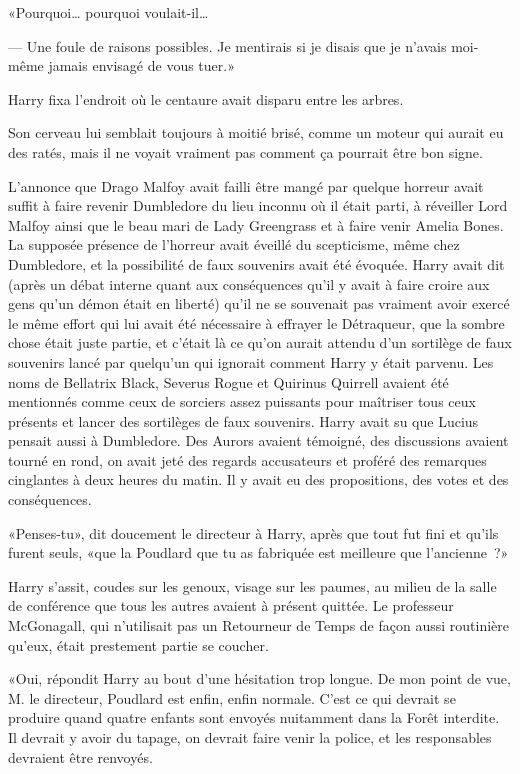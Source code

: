 «Pourquoi… pourquoi voulait-il…

--- Une foule de raisons possibles. Je mentirais si je disais que je n'avais moi-même jamais envisagé de vous tuer.»

Harry fixa l'endroit où le centaure avait disparu entre les arbres.

Son cerveau lui semblait toujours à moitié brisé, comme un moteur qui aurait eu des ratés, mais il ne voyait vraiment pas comment ça pourrait être bon signe.

\later

L'annonce que Drago Malfoy avait failli être mangé par quelque horreur avait suffit à faire revenir Dumbledore du lieu inconnu où il était parti, à réveiller Lord Malfoy ainsi que le beau mari de Lady Greengrass et à faire venir Amelia Bones. La supposée présence de l'horreur avait éveillé du scepticisme, même chez Dumbledore, et la possibilité de faux souvenirs avait été évoquée. Harry avait dit (après un débat interne quant aux conséquences qu'il y avait à faire croire aux gens qu'un démon était en liberté) qu'il ne se souvenait pas vraiment avoir exercé le même effort qui lui avait été nécessaire à effrayer le Détraqueur, que la sombre chose était juste partie, et c'était là ce qu'on aurait attendu d'un sortilège de faux souvenirs lancé par quelqu'un qui ignorait comment Harry y était parvenu. Les noms de Bellatrix Black, Severus Rogue et Quirinus Quirrell avaient été mentionnés comme ceux de sorciers assez puissants pour maîtriser tous ceux présents et lancer des sortilèges de faux souvenirs. Harry avait su que Lucius pensait aussi à Dumbledore. Des Aurors avaient témoigné, des discussions avaient tourné en rond, on avait jeté des regards accusateurs et proféré des remarques cinglantes à deux heures du matin. Il y avait eu des propositions, des votes et des conséquences.

«Penses-tu», dit doucement le directeur à Harry, après que tout fut fini et qu'ils furent seuls, «que la Poudlard que tu as fabriquée est meilleure que l'ancienne~?»

Harry s'assit, coudes sur les genoux, visage sur les paumes, au milieu de la salle de conférence que tous les autres avaient à présent quittée. Le professeur McGonagall, qui n'utilisait pas un Retourneur de Temps de façon aussi routinière qu'eux, était prestement partie se coucher.

«Oui, répondit Harry au bout d'une hésitation trop longue. De mon point de vue, M. le directeur, Poudlard est enfin, enfin normale. C'est ce qui devrait se produire quand quatre enfants sont envoyés nuitamment dans la Forêt interdite. Il devrait y avoir du tapage, on devrait faire venir la police, et les responsables devraient être renvoyés.

